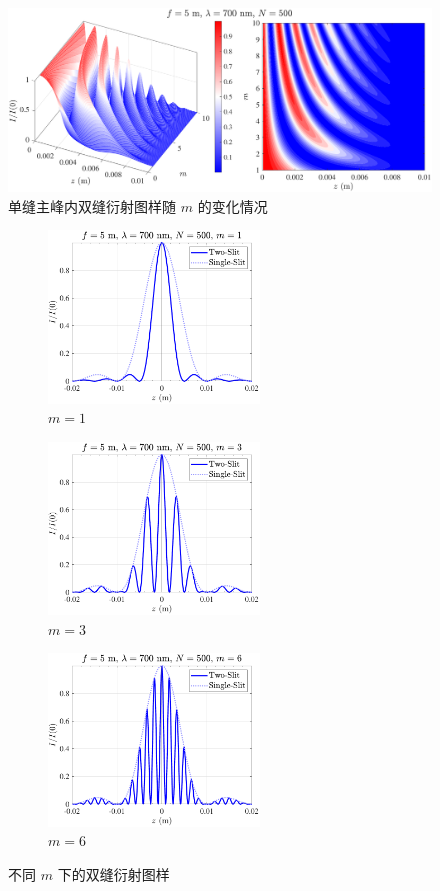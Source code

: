 \documentclass[UTF8]{report}
\theoremstyle{MyLineTheoremStyle} %
\theoremstyle{MyBlockTheoremStyle} %
\theoremstyle{MySubsubsectionStyle} %
\begin{document}
\begin{figure}[H]\centering
    \includegraphics[width=\columnwidth]{assets/4/4.3 m 变化.pdf}
    \caption{单缝主峰内双缝衍射图样随 $m$ 的变化情况}\label{主峰内双缝衍射图样变化}
\end{figure}
\begin{figure}[H]\centering
\begin{subfigure}[b]{0.33\columnwidth}\centering
    \includegraphics[height=130pt]{assets/4/4.3 m=1.pdf}
    \caption{$m=1$}
\end{subfigure}\hfill
\begin{subfigure}[b]{0.33\columnwidth}\centering
    \includegraphics[height=130pt]{assets/4/4.3 m=3.pdf}
    \caption{$m=3$}
\end{subfigure}
\begin{subfigure}[b]{0.33\columnwidth}\centering
    \includegraphics[height=130pt]{assets/4/4.3 m=6.pdf}
    \caption{$m=6$}
\end{subfigure}
\caption{不同 $m$ 下的双缝衍射图样}
\label{双缝衍射图样}
\end{figure}
\end{document}
